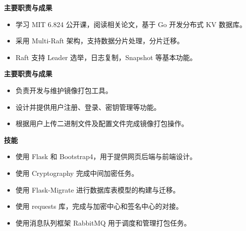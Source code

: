 \documentclass{resume}
\begin{document}
\begin{onehalfspacing}
  \textbf{主要职责与成果}

\begin{itemize}
  \item 学习 MIT 6.824 公开课，阅读相关论文，基于 Go 开发分布式 KV 数据库。
  \item 采用 Multi-Raft 架构，支持数据分片处理，分片迁移。
  \item Raft 支持 Leader 选举，日志复制，Snapshot 等基本功能。
\end{itemize}


\end{onehalfspacing}



\begin{onehalfspacing}
  \textbf{主要职责与成果}

\begin{itemize}
  \item 负责开发与维护镜像打包工具。
  \item 设计并提供用户注册、登录、密钥管理等功能。
  \item 根据用户上传二进制文件及配置文件完成镜像打包操作。
\end{itemize}

        \textbf{技能}

\begin{itemize}
  \item 使用 Flask 和 Bootstrap4，用于提供网页后端与前端设计。
  \item 使用 Cryptography 完成中间加密任务。
  \item 使用 Flask-Migrate 进行数据库表模型的构建与迁移。
  \item 使用 requests 库，完成与加密中心和签名中心的对接。
  \item 使用消息队列框架 RabbitMQ 用于调度和管理打包任务。
\end{itemize}

\end{onehalfspacing}
\end{document}
